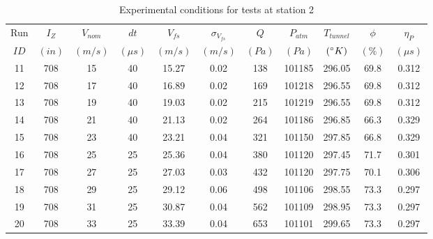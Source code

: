 \begin{table}[H]
\begin{center}
\begin{tabular}{|ccccccccccc|}
	\hline
	Run & $I_Z$ & $V_{nom}$ & $dt$ & $V_{fs}$ & $\sigma_{V_{fs}}$ & $Q$ & $P_{atm}$ & $T_{tunnel}$ & $\phi$ & $\eta_P$\\
	$ID$ & $(in)$ & $(m/s)$ & $(\mu s)$ & $(m/s)$ & $(m/s)$ & $(Pa)$ & $(Pa)$ & $(\degree K)$ & $(\%)$ & $(\mu s)$\\
	\hline
	11 & 708 & 15 & 40 & 15.27 & 0.02 & 138 & 101185 & 296.05 & 69.8 & 0.312\\
	12 & 708 & 17 & 40 & 16.89 & 0.02 & 169 & 101218 & 296.55 & 69.8 & 0.312\\
	13 & 708 & 19 & 40 & 19.03 & 0.02 & 215 & 101219 & 296.55 & 69.8 & 0.312\\
	14 & 708 & 21 & 40 & 21.13 & 0.02 & 264 & 101186 & 296.85 & 66.3 & 0.329\\
	15 & 708 & 23 & 40 & 23.21 & 0.04 & 321 & 101150 & 297.85 & 66.8 & 0.329\\
	16 & 708 & 25 & 25 & 25.36 & 0.04 & 380 & 101120 & 297.45 & 71.7 & 0.301\\
	17 & 708 & 27 & 25 & 27.03 & 0.03 & 432 & 101120 & 297.75 & 70.1 & 0.306\\
	18 & 708 & 29 & 25 & 29.12 & 0.06 & 498 & 101106 & 298.55 & 73.3 & 0.297\\
	19 & 708 & 31 & 25 & 30.87 & 0.04 & 562 & 101109 & 298.95 & 73.3 & 0.297\\
	20 & 708 & 33 & 25 & 33.39 & 0.04 & 653 & 101101 & 299.65 & 73.3 & 0.297\\
	\hline
\end{tabular}
\caption{Experimental conditions for tests at station 2}
\label{table:station_2_measurements.}
\end{center}
\end{table}
